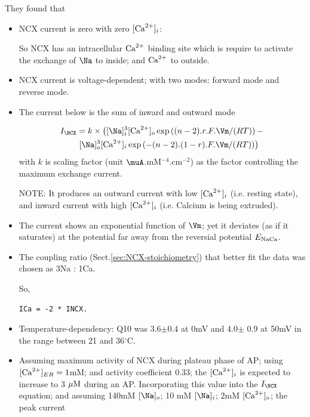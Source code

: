They found that 
\begin{itemize}
  \item NCX current is zero with zero $[{\text{Ca}^{2+}}]_i$:
  
  So NCX has an intracellular ${\text{Ca}^{2+}}$ binding site which is require to activate
  the exchange of $\Na$ to inside; and ${\text{Ca}^{2+}}$ to outside.
  
  \item NCX current is voltage-dependent; with two modes: forward mode and
  reverse mode.

    \item The current below is the sum of inward and outward mode
    
\begin{equation}
\begin{split}
I_\NCX &= k \times \left( 
 [\Na]_i^3 [\Ca]_o \exp \left((n-2).r.F.\Vm/(RT)\right) - \right. \\
 & \left. 
 [\Na]_o^3 [\Ca]_i \exp \left(-(n-2).(1-r).F.\Vm/(RT)\right)
\right)
\end{split}
\end{equation}
with $k$ is scaling factor (unit $\muA$.mM$^{-4}$.cm$^{-2}$) as the factor
controlling the maximum exchange current.

NOTE: It produces an outward current with low $[{\text{Ca}^{2+}}]_i$ (i.e.
resting state), and inward current with high $[{\text{Ca}^{2+}}]_i$ (i.e. Calcium is being
extruded).

  \item The current shows an exponential function of $\Vm$; yet
  it deviates (as if it saturates) at the potential far away from the reversial
  potential $E_{\text{NaCa}}$.
  
  \item The coupling ratio (Sect.\ref{sec:NCX-stoichiometry}) that better fit
  the data was chosen as 3Na :  1Ca.

So, 
\begin{verbatim}
ICa = -2 * INCX.
\end{verbatim}
    
    \item Temperature-dependency: Q10 was 3.6$\pm$0.4 at 0mV and 4.0$\pm$ 0.9 at
    50mV in the range between 21 and 36$^\circ$C.
    
    \item Assuming maximum activity of NCX during plateau phase of AP; using
    $[{\text{Ca}^{2+}}]_{ER}=1$mM; and activity coefficient 0.33;
    the $[{\text{Ca}^{2+}}]_i$ is expected to increase to 3 ${\mu\text{M}}$ during an AP.
    Incorporating this value into the $I_\NCX$ equation; and assuming
    140mM $[\Na]_o$; 10 mM $[\Na]_i$; 2mM $[{\text{Ca}^{2+}}]_o$; the peak current
    

\end{itemize}
